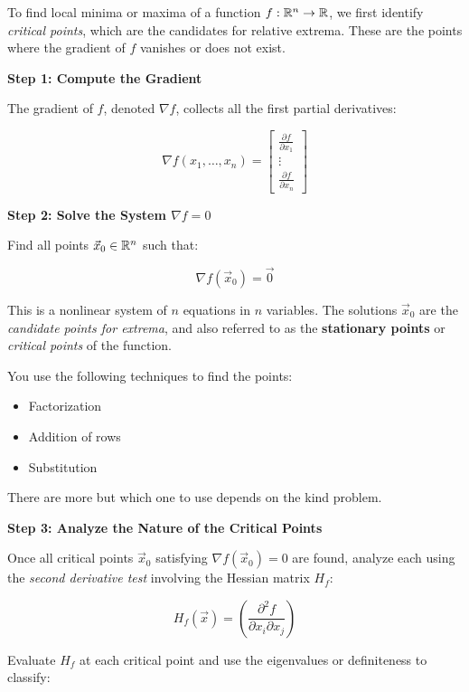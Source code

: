 To find local minima or maxima of a function \( f : \mathbb{R}^n \to \mathbb{R} \), we first identify 
\emph{critical points}, which are the candidates for relative extrema. 
These are the points where the gradient of \(f\) vanishes or does not exist.

\textbf{Step 1: Compute the Gradient}

The gradient of \(f\), denoted \( \nabla f \), collects all the first partial derivatives:

\[
    \nabla f(x_1, \dots, x_n) =
    \begin{bmatrix}
    \frac{\partial f}{\partial x_1} \\
    \vdots \\
    \frac{\partial f}{\partial x_n}
    \end{bmatrix}
\]

\textbf{Step 2: Solve the System \( \nabla f = 0 \)}

Find all points \( \vec{x}_0 \in \mathbb{R}^n \) such that:

\[
    \nabla f(\vec{x}_0) = \vec{0}
\]

This is a nonlinear system of \(n\) equations in \(n\) variables. The solutions \( \vec{x}_0 \) 
are the \emph{candidate points for extrema}, and also referred to as the 
\textbf{stationary points} or \emph{critical points} of the function.

You use the following techniques to find the points: 

\begin{itemize}

    \item Factorization

    \item Addition of rows

    \item Substitution

\end{itemize}

There are more but which one to use depends on the kind problem.

\textbf{Step 3: Analyze the Nature of the Critical Points}

Once all critical points \( \vec{x}_0 \) satisfying \( \nabla f(\vec{x}_0) = 0 \) are found, analyze 
each using the \emph{second derivative test} involving the Hessian matrix \( H_f \):

\[
    H_f(\vec{x}) = \left( \frac{\partial^2 f}{\partial x_i \partial x_j} \right)
\]

Evaluate \( H_f \) at each critical point and use the eigenvalues or definiteness to classify:

